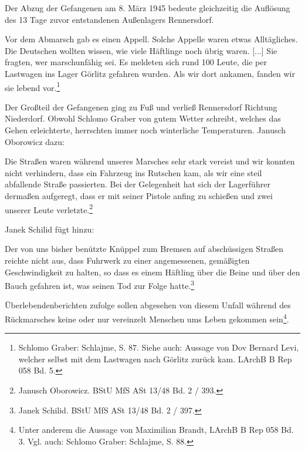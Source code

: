 Der Abzug der Gefangenen am 8. März 1945 bedeute gleichzeitig die Auflösung des 13 Tage zuvor entstandenen Außenlagers Rennersdorf. 

\begin{leftbar} 
Vor dem Abmarsch gab es einen Appell. Solche Appelle waren etwas Alltägliches. Die Deutschen wollten wissen, wie viele Häftlinge noch übrig waren. [...] Sie fragten, wer marschunfähig sei. Es meldeten sich rund 100 Leute, die per Lastwagen ins Lager Görlitz gefahren wurden. Als wir dort ankamen, fanden wir sie lebend vor.\footnote{Schlomo Graber: Schlajme, S. 87. Siehe auch: Aussage von Dov Bernard Levi, welcher selbst mit dem Lastwagen nach Görlitz zurück kam. LArchB B Rep 058 Bd. 5.}
\end{leftbar}

Der Großteil der Gefangenen ging zu Fuß und verließ Rennersdorf Richtung Niederdorf. Obwohl Schlomo Graber von gutem Wetter schreibt, welches das \glqq Gehen erleichterte\grqq, herrschten immer noch winterliche Temperaturen. Janusch Oborowicz dazu:
\begin{leftbar} 
Die Straßen waren während unseres Marsches sehr stark vereist und wir konnten nicht verhindern, dass ein Fahrzeug ins Rutschen kam, als wir eine steil abfallende Straße passierten. Bei der Gelegenheit hat sich der Lagerführer dermaßen aufgeregt, dass er mit seiner Pistole anfing zu schießen und zwei unserer Leute verletzte.\footnote{Janusch Oborowicz. BStU MfS ASt 13/48 Bd. 2 / 393.}
\end{leftbar}
Janek Schilid fügt hinzu:
\begin{leftbar} 
Der von uns bisher benützte Knüppel zum Bremsen auf abschüssigen Straßen reichte nicht aus, dass Fuhrwerk zu einer angemessenen, gemäßigten Geschwindigkeit zu halten, so dass es einem Häftling über die Beine und über den Bauch gefahren ist, was seinen Tod zur Folge hatte.\footnote{Janek Schilid. BStU MfS ASt 13/48 Bd. 2 / 397.}
\end{leftbar}
Überlebendenberichten zufolge sollen abgesehen von diesem Unfall während des Rückmarsches keine oder nur vereinzelt Menschen ums Leben gekommen sein\footnote{Unter anderem die Aussage von Maximilian Brandt, LArchB B Rep 058 Bd. 3. Vgl. auch: Schlomo Graber: Schlajme, S. 88.}.



